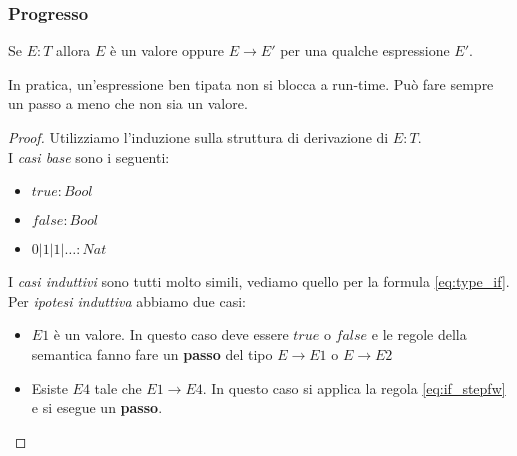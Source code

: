 \subsubsection{Progresso}
\begin{definition}[Progresso]
	Se $E:T$ allora $E$ è un valore oppure $E \rightarrow E'$ per una qualche espressione $E'$.
\end{definition}
In pratica, un'espressione ben tipata non si blocca a run-time. Può fare sempre un passo a meno che non sia un valore.
\begin{proof}
	Utilizziamo l'induzione sulla struttura di derivazione di $E:T$.\\
	I \textit{casi base} sono i seguenti:
	\begin{itemize}
		\item $true:Bool$
		\item $false:Bool$
		\item $0 \vert 1 \vert 1 \vert \ldots : Nat$
	\end{itemize}
	I \textit{casi induttivi} sono tutti molto simili, vediamo quello per la formula \ref{eq:type_if}. \\
	Per \textit{ipotesi induttiva} abbiamo due casi:
	\begin{itemize}
		\item $E1$ è un valore. In questo caso deve essere $true$ o $false$ e le regole della semantica fanno fare un \textbf{passo} del tipo $E \rightarrow E1$ o $E \rightarrow E2$
		\item  Esiste $E4$ tale che $E1 \rightarrow E4$. In questo caso si applica la regola \ref{eq:if_stepfw} e si esegue un \textbf{passo}.
	\end{itemize}
\end{proof}


